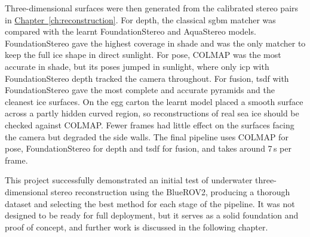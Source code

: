 Three-dimensional surfaces were then generated from the calibrated stereo pairs in \hyperref[ch:reconstruction]{Chapter~\ref*{ch:reconstruction}}.
For depth, the classical \gls{sgbm} matcher was compared with the learnt FoundationStereo and AquaStereo models.
FoundationStereo gave the highest coverage in shade and was the only matcher to keep the full ice shape in direct
sunlight. For pose, COLMAP was the most accurate in shade, but its poses jumped in sunlight, where only \gls{icp}
with FoundationStereo depth tracked the camera throughout. For fusion, \gls{tsdf} with FoundationStereo gave the
most complete and accurate pyramids and the cleanest ice surfaces. On the egg carton the learnt model placed a
smooth surface across a partly hidden curved region, so reconstructions of real sea ice should be checked against
COLMAP. Fewer frames had little effect on the surfaces facing the camera but degraded the side walls. The final
pipeline uses COLMAP for pose, FoundationStereo for depth and \gls{tsdf} for fusion, and takes around 7\,s per frame.

This project successfully demonstrated an initial test of underwater three-dimensional stereo reconstruction using
the BlueROV2, producing a thorough dataset and selecting the best method for each stage of the pipeline. It was not
designed to be ready for full deployment, but it serves as a solid foundation and proof of concept, and further work
is discussed in the following chapter.
